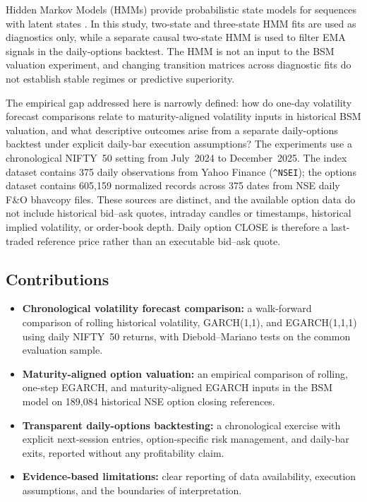\documentclass[journal]{IEEEtran}
\begin{document}
Hidden Markov Models (HMMs) provide probabilistic state models for sequences with latent states \cite{rabiner1989,hamilton1994}. In this study, two-state and three-state HMM fits are used as diagnostics only, while a separate causal two-state HMM is used to filter EMA signals in the daily-options backtest. The HMM is not an input to the BSM valuation experiment, and changing transition matrices across diagnostic fits do not establish stable regimes or predictive superiority.

The empirical gap addressed here is narrowly defined: how do one-day volatility forecast comparisons relate to maturity-aligned volatility inputs in historical BSM valuation, and what descriptive outcomes arise from a separate daily-options backtest under explicit daily-bar execution assumptions? The experiments use a chronological NIFTY~50 setting from July~2024 to December~2025. The index dataset contains 375 daily observations from Yahoo Finance (\texttt{\string^NSEI}); the options dataset contains 605{,}159 normalized records across 375 dates from NSE daily F\&O bhavcopy files. These sources are distinct, and the available option data do not include historical bid--ask quotes, intraday candles or timestamps, historical implied volatility, or order-book depth. Daily option CLOSE is therefore a last-traded reference price rather than an executable bid--ask quote.

\subsection*{Contributions}

\begin{itemize}
\item \textbf{Chronological volatility forecast comparison:} a walk-forward comparison of rolling historical volatility, GARCH(1,1), and EGARCH(1,1,1) using daily NIFTY~50 returns, with Diebold--Mariano tests on the common evaluation sample.
\item \textbf{Maturity-aligned option valuation:} an empirical comparison of rolling, one-step EGARCH, and maturity-aligned EGARCH inputs in the BSM model on 189{,}084 historical NSE option closing references.
\item \textbf{Transparent daily-options backtesting:} a chronological exercise with explicit next-session entries, option-specific risk management, and daily-bar exits, reported without any profitability claim.
\item \textbf{Evidence-based limitations:} clear reporting of data availability, execution assumptions, and the boundaries of interpretation.
\end{itemize}
\end{document}
